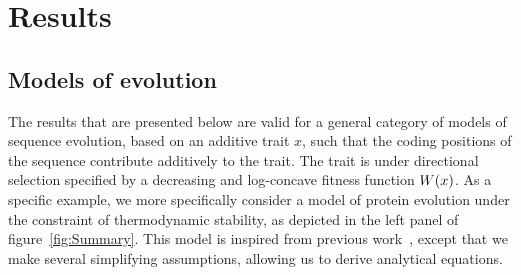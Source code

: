 \documentclass{article}
\begin{document}
\section{Results}

\subsection{Models of evolution}

The results that are presented below are valid for a general category of models of sequence evolution, based on an additive trait $x$, such that the coding positions of the sequence contribute additively to the trait.
The trait is under directional selection specified by a decreasing and log-concave fitness function $ W (x)$.
As a specific example, we more specifically consider a model of protein evolution under the constraint of thermodynamic stability, as depicted in the left panel of figure~\ref{fig:Summary}.
This model is inspired from previous work~\citep{Williams2006, Goldstein2011, Pollock2012}, except that we make several simplifying assumptions, allowing us to derive analytical equations.
\end{document}
